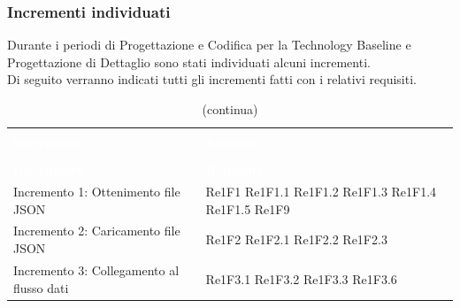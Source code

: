 \pagebreak
\subsubsection{Incrementi individuati}
Durante i periodi di Progettazione e Codifica per la Technology Baseline e Progettazione di Dettaglio sono stati individuati alcuni incrementi. \\
Di seguito verranno indicati tutti gli incrementi fatti con i relativi requisiti.


\begin{longtable}{C{4cm} L{3cm}}
\caption{Tracciamento incrementi} \\
\textcolor{white}{\textbf{Incremento}} &
\textcolor{white}{\textbf{Requisiti}} \\
		\endfirsthead
		\caption[]{(continua)} \\
\textcolor{white}{\textbf{Incremento}} &
\textcolor{white}{\textbf{Requisiti}} \\
		\endhead
Incremento 1: Ottenimento file JSON			& Re1F1 \newline Re1F1.1  \newline Re1F1.2 \newline Re1F1.3 \newline Re1F1.4 \newline Re1F1.5 \newline Re1F9\\
Incremento 2: Caricamento file JSON			& Re1F2 \newline Re1F2.1 \newline Re1F2.2 \newline Re1F2.3\\
Incremento 3: Collegamento al flusso dati	& Re1F3.1 \newline Re1F3.2 \newline Re1F3.3 \newline Re1F3.6
\end{longtable}
